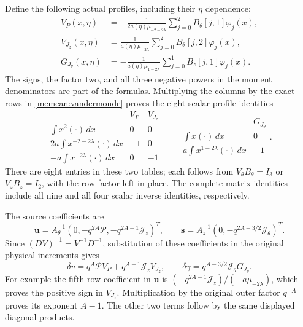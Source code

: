 Define the following actual profiles, including their \(\eta\) dependence:
\begin{equation}\label{mcmean:profiles}
\begin{split}
 V_P(x,\eta)&=-\frac{1}{2a(\eta)\mu_{-2-2\lambda}}
                   \sum_{j=0}^2B_\theta[j,1]\varphi_j(x),\\
 V_{J_z}(x,\eta)&=\frac{1}{a(\eta)\mu_{-2\lambda}}
                   \sum_{j=0}^2B_\theta[j,2]\varphi_j(x),\\
 G_{J_\theta}(x,\eta)&=-\frac{1}{a(\eta)\mu_{1-2\lambda}}
                   \sum_{j=0}^1B_z[j,1]\varphi_j(x).
\end{split}
\end{equation}
The signs, the factor two, and all three negative powers in the moment
denominators are part of the formulas. Multiplying the columns by
the exact rows in \eqref{mcmean:vandermonde} proves the eight scalar
profile identities
\begin{equation}\label{mcmean:profile_moments}
\begin{array}{c|cc}
 &V_P&V_{J_z}\\ \hline
 \int x^2(\cdot)\,dx&0&0\\
 2a\int x^{-2-2\lambda}(\cdot)\,dx&-1&0\\
 -a\int x^{-2\lambda}(\cdot)\,dx&0&-1
\end{array}
\qquad
\begin{array}{c|c}
 &G_{J_\theta}\\ \hline
 \int x(\cdot)\,dx&0\\
 a\int x^{1-2\lambda}(\cdot)\,dx&-1
\end{array}.
\end{equation}
There are eight entries in these two tables; each follows from
\(V_\theta B_\theta=I_3\) or \(V_zB_z=I_2\), with the row factor
left in place. The complete matrix identities include all nine and
all four scalar inverse identities, respectively.

The source coefficients are
\[
 \boldsymbol u=A_\theta^{-1}
       (0,-q^{2A}\mathcal P,-q^{2A-1}\mathcal J_z)^T,
 \qquad
 \boldsymbol s=A_z^{-1}
       (0,-q^{2A-3/2}\mathcal J_\theta)^T.
\]
Since \((DV)^{-1}=V^{-1}D^{-1}\), substitution of these coefficients
in the original physical increments gives
\begin{equation}\label{mcmean:tangential_increment}
 \delta v=q^A\mathcal P V_P+q^{A-1}\mathcal J_zV_{J_z},
 \qquad
 \delta\gamma=q^{A-3/2}\mathcal J_\theta G_{J_\theta}.
\end{equation}
For example the fifth-row coefficient in \(\boldsymbol u\) is
\((-q^{2A-1}\mathcal J_z)/(-a\mu_{-2\lambda})\), which proves
the positive sign in \(V_{J_z}\). Multiplication by the original
outer factor \(q^{-A}\) proves its exponent \(A-1\).
The other two terms follow by the same displayed diagonal products.

